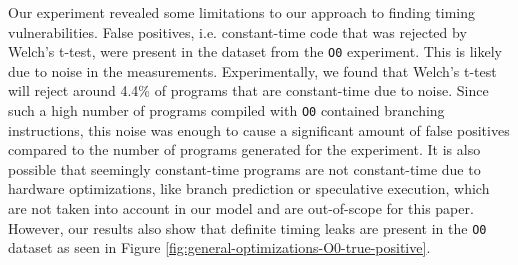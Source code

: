 Our experiment revealed some limitations to our approach to finding timing vulnerabilities. 
False positives, i.e. constant-time code that was rejected by Welch's t-test, were present in the dataset from the \texttt{O0} experiment. 
This is likely due to noise in the measurements. 
Experimentally, we found that Welch's t-test will reject around 4.4\% of programs that are constant-time due to noise.
Since such a high number of programs compiled with \texttt{O0} contained branching instructions, this noise was enough to cause a significant amount of false positives compared to the number of programs generated for the experiment.
It is also possible that seemingly constant-time programs are not constant-time due to hardware optimizations, like branch prediction or speculative execution, which are not taken into account in our model and are out-of-scope for this paper.
However, our results also show that definite timing leaks are present in the \texttt{O0} dataset as seen in Figure \ref{fig:general-optimizations-O0-true-positive}.

